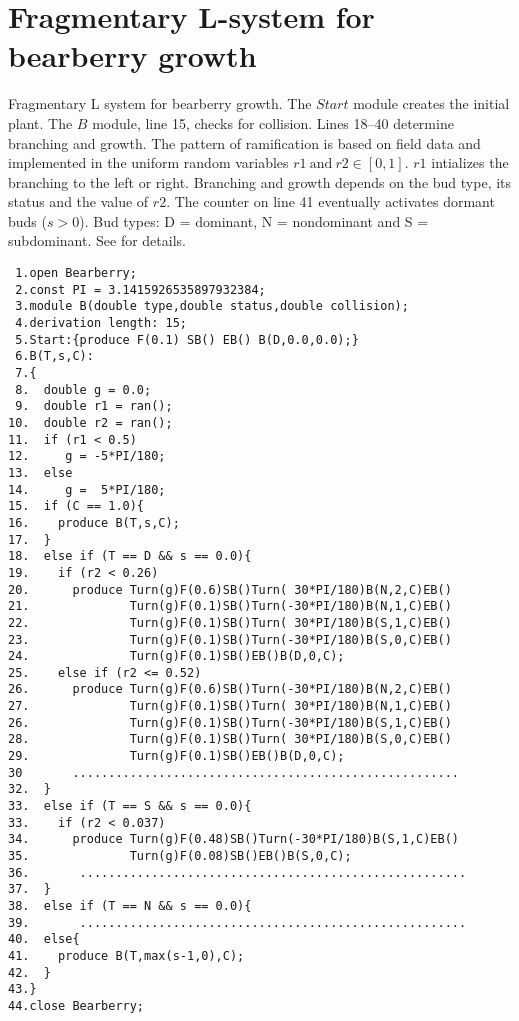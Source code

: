 \section{Fragmentary  L-system   for  bearberry  growth}\label{sec:L2}

Fragmentary L system for  bearberry growth. The $Start$ module creates
the initial  plant.  The  $B$ module, line  15, checks  for collision.
Lines  18--40   determine  branching  and  growth.    The  pattern  of
ramification is  based on  field data and  implemented in  the uniform
random variables $r1~\mathrm{and}~r2  \in [0,1]$.  $r1$ intializes the
branching to the  left or right.  Branching and  growth depends on the
bud type,  its status and the value  of $r2$.  The counter  on line 41
eventually activates dormant buds ($s > 0$).  Bud types: D = dominant,
N  = nondominant  and  S =  subdominant.   See \citet{salemaa:02}  for
details.

\begin{verbatim}
 1.open Bearberry;
 2.const PI = 3.1415926535897932384;
 3.module B(double type,double status,double collision); 
 4.derivation length: 15;
 5.Start:{produce F(0.1) SB() EB() B(D,0.0,0.0);}
 6.B(T,s,C):
 7.{
 8.  double g = 0.0;
 9.  double r1 = ran();
10.  double r2 = ran();
11.  if (r1 < 0.5) 
12.     g = -5*PI/180;
13.  else 
14.     g =  5*PI/180;
15.  if (C == 1.0){
16.    produce B(T,s,C);
17.  }
18.  else if (T == D && s == 0.0){
19.    if (r2 < 0.26)
20.      produce Turn(g)F(0.6)SB()Turn( 30*PI/180)B(N,2,C)EB() 
21.              Turn(g)F(0.1)SB()Turn(-30*PI/180)B(N,1,C)EB()
22.              Turn(g)F(0.1)SB()Turn( 30*PI/180)B(S,1,C)EB()
23.              Turn(g)F(0.1)SB()Turn(-30*PI/180)B(S,0,C)EB()
24.              Turn(g)F(0.1)SB()EB()B(D,0,C);
25.    else if (r2 <= 0.52)
26.      produce Turn(g)F(0.6)SB()Turn(-30*PI/180)B(N,2,C)EB() 
27.              Turn(g)F(0.1)SB()Turn( 30*PI/180)B(N,1,C)EB()
26.              Turn(g)F(0.1)SB()Turn(-30*PI/180)B(S,1,C)EB()
28.              Turn(g)F(0.1)SB()Turn( 30*PI/180)B(S,0,C)EB()
29.              Turn(g)F(0.1)SB()EB()B(D,0,C);
30       ......................................................
32.  } 
33.  else if (T == S && s == 0.0){
33.    if (r2 < 0.037)
34.      produce Turn(g)F(0.48)SB()Turn(-30*PI/180)B(S,1,C)EB()
35.              Turn(g)F(0.08)SB()EB()B(S,0,C);
36.       ......................................................
37.  }
38.  else if (T == N && s == 0.0){
39.       ......................................................
40.  else{
41.    produce B(T,max(s-1,0),C);
42.  }
43.}
44.close Bearberry;
\end{verbatim}

